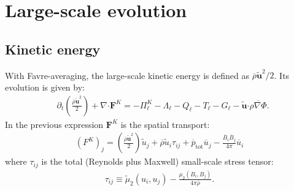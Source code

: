 \documentclass[]{article}
\newcommand{\bcdot}{\bm{\cdot}}
\begin{document}
\section{Large-scale evolution}

\subsection{Kinetic energy}

With Favre-averaging, the large-scale kinetic energy is defined as $\overline{\rho} \tilde{\bm u}^2 / 2$. Its evolution is given by:
%
\begin{align}\label{eq:large-scale-kin-en}
	&\partial_t \left( \frac{\overline{\rho} \tilde{\bm u}^2}{2} \right) + \nabla \bcdot \bm F^K = - \Pi^K_{\ell} - \Lambda_{\ell} - Q_{\ell}  - T_{\ell} - G_{\ell} - \tilde{\bm u} \bcdot \overline{\rho \nabla \Phi} . 
\end{align}
%
In the previous expression $\bm F^K$ is the spatial transport: 
\begin{align}
	(F^K)_j = \left( \frac{\overline{\rho} \tilde{\bm u}^2}{2}  \right) \tilde{u}_j +  \overline{\rho} \tilde{u}_i \tau_{ij} + \overline{p}_{\mathrm{tot}} \overline{u}_j - \frac{\overline{B}_i \overline{B}_j}{4\pi} \overline{u}_i  
\end{align}
where $\tau_{ij}$ is the total (Reynolds plus Maxwell) small-scale stress tensor:
\begin{align}
	\tau_{ij} \equiv \tilde{\mu}_2 (u_i, u_j) - \frac{\mu_2 (B_i, B_j)}{4\pi \overline{\rho}} .
\end{align}
\end{document}

